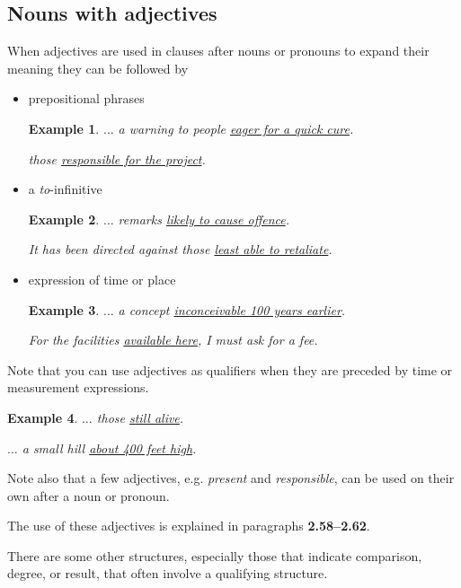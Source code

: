 \documentclass[oneside]{book}
\numberwithin{equation}{section}
\newtheorem{example}{Example}[section]
\begin{document}
\subsection{Nouns with adjectives}
\noindent{} When adjectives are used in clauses after nouns or pronouns to expand their meaning they can be followed by
\begin{itemize}
    \item prepositional phrases
    \begin{example}
        $\ldots$ a warning to people \underline{eager for a quick cure}.
        
        those \underline{responsible for the project}.
    \end{example}
    \item a \textit{to}-infinitive
    \begin{example}
        $\ldots$ remarks \underline{likely to cause offence}.
        
        It has been directed against those \underline{least able to retaliate}.
    \end{example}
    \item expression of time or place
    \begin{example}
        $\ldots$ a concept \underline{inconceivable 100 years earlier}.
        
        For the facilities \underline{available here}, I must ask for a fee.
    \end{example}
\end{itemize}
Note that you can use adjectives as qualifiers when they are preceded by time or measurement expressions.
\begin{example}
    $\ldots$ those \underline{still alive}.
    
    $\ldots$ a small hill \underline{about 400 feet high}.
\end{example}
Note also that a few adjectives, e.g. \textit{present} and \textit{responsible}, can be used on their own after a noun or pronoun.

The use of these adjectives is explained in paragraphs \textbf{2.58--2.62}.

%
\noindent{} There are some other structures, especially those that indicate comparison, degree, or result, that often involve a qualifying structure.
\end{document}
